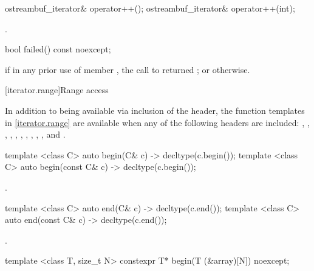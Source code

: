 %
\begin{itemdecl}
ostreambuf_iterator& operator++();
ostreambuf_iterator& operator++(int);
\end{itemdecl}

\begin{itemdescr}
\pnum
\returns
{}.
\end{itemdescr}

%
\begin{itemdecl}
bool failed() const noexcept;
\end{itemdecl}

\begin{itemdescr}
\pnum
\returns
{}
if in any prior use of member
,
the call to
returned
;
or
otherwise.
\end{itemdescr}

[iterator.range]{Range access}

\pnum
In addition to being available via inclusion of the  header,
the function templates in \ref{iterator.range} are available when any of the following
headers are included: , , ,
, , , , ,
, , and .

%
\begin{itemdecl}
template <class C> auto begin(C& c) -> decltype(c.begin());
template <class C> auto begin(const C& c) -> decltype(c.begin());
\end{itemdecl}

\begin{itemdescr}
\pnum
\returns {}.
\end{itemdescr}

%
\begin{itemdecl}
template <class C> auto end(C& c) -> decltype(c.end());
template <class C> auto end(const C& c) -> decltype(c.end());
\end{itemdecl}

\begin{itemdescr}
\pnum
\returns {}.
\end{itemdescr}

%
\begin{itemdecl}
template <class T, size_t N> constexpr T* begin(T (&array)[N]) noexcept;
\end{itemdecl}

